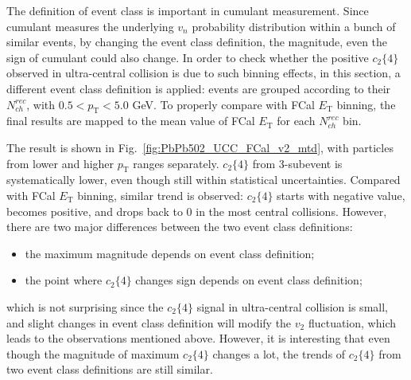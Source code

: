 The definition of event class is important in cumulant measurement. Since cumulant measures the underlying $v_n$ probability distribution within a bunch of similar events, by changing the event class definition, the magnitude, even the sign of cumulant could also change. In order to check whether the positive $c_2\{4\}$ observed in ultra-central collision is due to such binning effects, in this section, a different event class definition is applied: events are grouped according to their $N_{ch}^{rec}$, with $0.5<p_\text{T}<5.0$ GeV. To properly compare with FCal $E_\text{T}$ binning, the final results are mapped to the mean value of FCal $E_\text{T}$ for each $N_{ch}^{rec}$ bin.

The result is shown in Fig.~\ref{fig:PbPb502_UCC_FCal_v2_mtd}, with particles from lower and higher $p_\text{T}$ ranges separately. $c_2\{4\}$ from 3-subevent is systematically lower, even though still within statistical uncertainties. Compared with FCal $E_\text{T}$ binning, similar trend is observed: $c_2\{4\}$ starts with negative value, becomes positive, and drops back to 0 in the most central collisions. However, there are two major differences between the two event class definitions:
\begin{itemize}
\item the maximum magnitude depends on event class definition;
\item the point where $c_2\{4\}$ changes sign depends on event class definition;
\end{itemize}
which is not surprising since the $c_2\{4\}$ signal in ultra-central collision is small, and slight changes in event class definition will modify the $v_2$ fluctuation, which leads to the observations mentioned above. However, it is interesting that even though the magnitude of maximum $c_2\{4\}$ changes a lot, the trends of $c_2\{4\}$ from two event class definitions are still similar.

